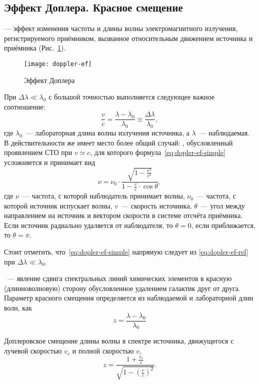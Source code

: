 \subsection{Эффект Доплера. Красное смещение} 
 --- эффект изменения частоты и длины волны электромагнитного излучения, регистрируемого приёмником, вызванное относительным движением источника и приёмника (Рис.~\ref{doppler-ef}).

\begin{figure}[h!]
	\centering
	\texttt{[image: doppler-ef]}
	\caption{Эффект Доплера}
	\label{doppler-ef}
\end{figure}

При $\Delta \lambda \ll \lambda_0$ с большой точностью выполняется следующее важное соотношение:\begin{equation}
	\frac{v}{c} = \frac{\lambda - \lambda_0}{\lambda_0} \equiv \frac{\Delta \lambda}{\lambda_0},
	\label{eq:dopler-ef-simple}
\end{equation}
где $\lambda_0$~--- лабораторная длина волны излучения источника, а $\lambda$~--- наблюдаемая. 
В действительности же имеет место более общий случай: , обусловленный проявлением СТО при $v \simeq c$, для которого формула~\eqref{eq:dopler-ef-simple} усложняется и принимает вид \begin{equation}
	\nu = \nu_0 \cdot \frac{\sqrt{1 - \frac{v^2}{c^2}}}{1 - \frac{v}{c}\cdot \cos\theta},
	\label{eq:dopler-ef-rel}
\end{equation}
где $\nu$~--- частота, с которой наблюдатель принимает волны, $\nu_0$~--- частота, с которой источник испускает волны, $v$~--- скорость источника, $\theta$~--- угол между направлением на источник и вектором скорости в системе отсчёта приёмника. Если источник радиально удаляется от наблюдателя, то $\theta = 0$, если приближается, то $\theta =\pi$. 

Стоит отметить, что~\eqref{eq:dopler-ef-simple} напрямую следует из \eqref{eq:dopler-ef-rel} при $\Delta \lambda \ll \lambda_0$.

~--- явление сдвига спектральных линий химических элементов в красную (длинноволновую) сторону обусловленное удалением галактик друг от друга. Параметр красного смещения определяется из наблюдаемой и лабораторной длин волн, как
\begin{equation}
	z = \frac{\lambda - \lambda_0}{\lambda_0}
\end{equation}

Доплеровское смещение длины волны в спектре источника, движущегося с лучевой скоростью $v_{r}$ и полной скоростью $v$,
\begin{equation}
z = \frac{1 + \frac{v_r}{c}}{\sqrt{1 - \left(\frac{v}{c}\right)^2}}.
\end{equation}

